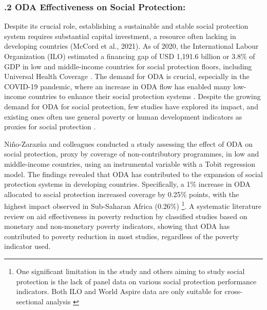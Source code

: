 \subsubsection*{.2 ODA Effectiveness on Social Protection:}
Despite its crucial role, establishing a sustainable and stable social protection system requires substantial capital investment, a resource often lacking in developing countries (McCord et al., 2021). As of 2020, the International Labour Organization (ILO) estimated a financing gap of USD 1,191.6 billion or 3.8\% of GDP in low and middle-income countries for social protection floors, including Universal Health Coverage \parencite{duran-valverde_financing_2020}. The demand for ODA is crucial, especially in the COVID-19 pandemic, where an increase in ODA flow has enabled many low-income countries to enhance their social protection systems \parencite{mccord_official_2021}. Despite the growing demand for ODA for social protection, few studies have explored its impact, and existing ones often use general poverty or human development indicators as proxies for social protection \parencite{forte_impact_2023, lonnroth_beyond_2014, mahembe_foreign_2019, shafiullah_foreign_2011}.

Niño-Zarazúa and colleagues conducted a study assessing the effect of ODA on social protection, proxy by coverage of non-contributory programmes, in low and middle-income countries, using an instrumental variable with a Tobit regression model. The findings revealed that ODA has contributed to the expansion of social protection systems in developing countries. Specifically, a 1\% increase in ODA allocated to social protection increased coverage by 0.25\% points, with the highest impact observed in Sub-Saharan Africa (0.26\%) \parencite{nino-zarazua_aids_2023} \footnote{One significant limitation in the study and others aiming to study social protection is the lack of panel data on various social protection performance indicators. Both ILO and World Aspire data are only suitable for cross-sectional analysis \parencite{nino-zarazua_aids_2023}}. A systematic literature review on aid effectiveness in poverty reduction by \textcite{mahembe_foreign_2019} classified studies based on monetary and non-monetary poverty indicators, showing that ODA has contributed to poverty reduction in most studies, regardless of the poverty indicator used. 

